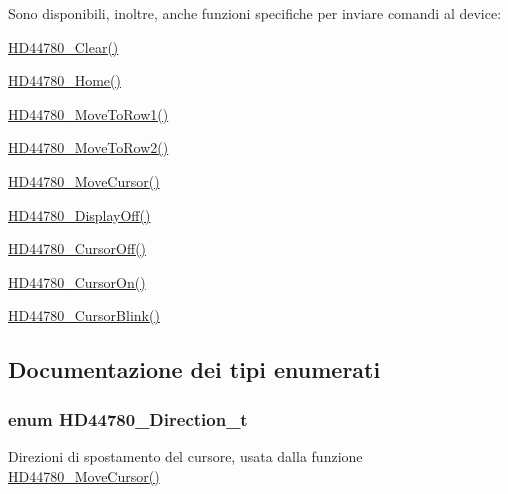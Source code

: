 Sono disponibili, inoltre, anche funzioni specifiche per inviare comandi al device\+:
\begin{DoxyItemize}
\item \hyperlink{group___h_d44780_ga38cac13d7a66f068be54f79a716ff7d4}{H\+D44780\+\_\+\+Clear()}
\item \hyperlink{group___h_d44780_ga68e3712332aa9482d4bdaa4991a92127}{H\+D44780\+\_\+\+Home()}
\item \hyperlink{group___h_d44780_gad90e2924a4e632ce42940323f8f49e37}{H\+D44780\+\_\+\+Move\+To\+Row1()}
\item \hyperlink{group___h_d44780_ga713670d498b6f5d50a174df19081c515}{H\+D44780\+\_\+\+Move\+To\+Row2()}
\item \hyperlink{group___h_d44780_gabcea9a03050c46530e39b7556c673baf}{H\+D44780\+\_\+\+Move\+Cursor()}
\item \hyperlink{group___h_d44780_ga5cf07b2179272029410f9a81f56621ed}{H\+D44780\+\_\+\+Display\+Off()}
\item \hyperlink{group___h_d44780_ga56421dc398825188aa10257063a3ee4b}{H\+D44780\+\_\+\+Cursor\+Off()}
\item \hyperlink{group___h_d44780_ga3a381cb44df5d76d79be5ed71a52bae6}{H\+D44780\+\_\+\+Cursor\+On()}
\item \hyperlink{group___h_d44780_ga92eb58cb7d73c9a87b7087a9c56f73d5}{H\+D44780\+\_\+\+Cursor\+Blink()}~\newline
 
\end{DoxyItemize}

\subsection{Documentazione dei tipi enumerati}
\hypertarget{group___h_d44780_gaf46f4db4f981d3a1088804a6d6980d30}{
\subsubsection[{H\+D44780\+\_\+\+Direction\+\_\+t}]{\setlength{\rightskip}{0pt plus 5cm}enum {\bf H\+D44780\+\_\+\+Direction\+\_\+t}}}\label{group___h_d44780_gaf46f4db4f981d3a1088804a6d6980d30}


Direzioni di spostamento del cursore, usata dalla funzione \hyperlink{group___h_d44780_gabcea9a03050c46530e39b7556c673baf}{H\+D44780\+\_\+\+Move\+Cursor()} 


